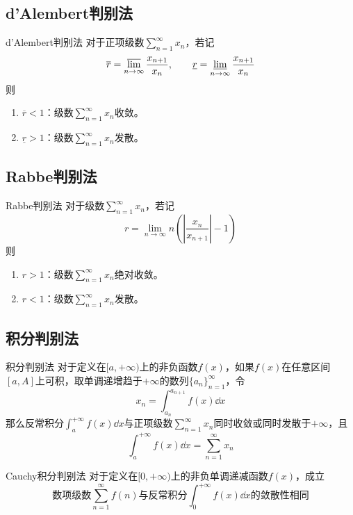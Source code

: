 \documentclass[lang = cn, scheme = chinese, thmcnt = section]{elegantbook}
\begin{document}
\subsection{d'Alembert判别法}

\begin{theorem}{d'Alembert判别法}
	对于正项级数$\displaystyle \sum_{n=1}^{\infty}x_n$，若记
	$$
	\overline{r}=\varlimsup_{n\to\infty} \frac{x_{n+1}}{x_n},\qquad 
	\underline{r}=\varliminf_{n\to\infty} \frac{x_{n+1}}{x_n}
	$$
	则
	\begin{enumerate}
		\item $\overline{r}<1$：级数$\displaystyle \sum_{n=1}^{\infty}x_n$收敛。
		\item $\underline{r}>1$：级数$\displaystyle \sum_{n=1}^{\infty}x_n$发散。
	\end{enumerate}
\end{theorem}

\subsection{Rabbe判别法}

\begin{theorem}{Rabbe判别法}
	对于级数$\displaystyle \sum_{n=1}^{\infty}x_n$，若记
	$$
	r=\lim_{n\to\infty} n\left(\left|\frac{x_n}{x_{n+1}}\right|-1\right)
	$$
	则
	\begin{enumerate}
		\item $r>1$：级数$\displaystyle \sum_{n=1}^{\infty}x_n$绝对收敛。
		\item $r<1$：级数$\displaystyle \sum_{n=1}^{\infty}x_n$发散。
	\end{enumerate}
\end{theorem}

\subsection{积分判别法}

\begin{theorem}{积分判别法}
	对于定义在$[a,+\infty)$上的非负函数$f(x)$，如果$f(x)$在任意区间$[a,A]$上可积，取单调递增趋于$+\infty$的数列$\{a_n\}_{n=1}^{\infty}$，令
	$$
	x_n=\int_{a_n}^{a_{n+1}}f(x)\dd x
	$$
	那么反常积分$\displaystyle \int_a^{+\infty}f(x)\dd x$与正项级数$\displaystyle \sum_{n=1}^{\infty}x_n$同时收敛或同时发散于$+\infty$，且
	$$
	\int_a^{+\infty}f(x)\dd x
	=\sum_{n=1}^{\infty}x_n
	$$
\end{theorem}

\begin{theorem}{Cauchy积分判别法}
	对于定义在$[0,+\infty)$上的非负单调递减函数$f(x)$，成立
	$$
	\text{数项级数}\sum_{n=1}^{\infty}f(n)\text{与}
	\text{反常积分}\int_0^{+\infty}f(x)\dd x\text{的敛散性相同}
	$$
\end{theorem}
\end{document}
